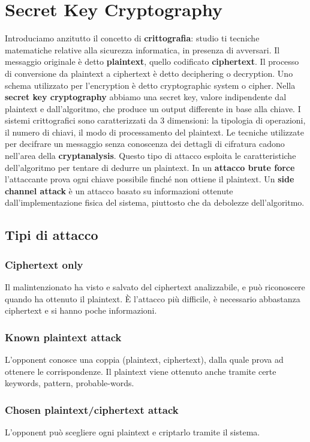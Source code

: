 \documentclass[11pt]{article}
\begin{document}
\section{Secret Key Cryptography}
Introduciamo anzitutto il concetto di \textbf{crittografia}: studio ti tecniche matematiche relative alla sicurezza informatica, in presenza di avversari. Il messaggio originale è detto \textbf{plaintext}, quello codificato \textbf{ciphertext}. Il processo di conversione da plaintext a ciphertext è detto deciphering o decryption. Uno schema utilizzato per l'encryption è detto cryptographic system o cipher.
Nella \textbf{secret key cryptography} abbiamo una secret key, valore indipendente dal plaintext e dall'algoritmo, che produce un output differente in base alla chiave.
I sistemi crittografici sono caratterizzati da 3 dimensioni: la tipologia di operazioni, il numero di chiavi, il modo di processamento del plaintext.
Le tecniche utilizzate per decifrare un messaggio senza conoscenza dei dettagli di cifratura cadono nell'area della \textbf{cryptanalysis}. Questo tipo di attacco esploita le caratteristiche dell'algoritmo per tentare di dedurre un plaintext. In un \textbf{attacco brute force} l'attaccante prova ogni chiave possibile finché non ottiene il plaintext. Un \textbf{side channel attack} è un attacco basato su informazioni ottenute dall'implementazione fisica del sistema, piuttosto che da debolezze dell'algoritmo. 
\subsection{Tipi di attacco}
\subsubsection{Ciphertext only}
Il malintenzionato ha visto e salvato del ciphertext analizzabile, e può riconoscere quando ha ottenuto il plaintext. È l'attacco più difficile, è necessario abbastanza ciphertext e si hanno poche informazioni.
\subsubsection{Known plaintext attack}
L'opponent conosce una coppia (plaintext, ciphertext), dalla quale prova ad ottenere le corrispondenze. Il plaintext viene ottenuto anche tramite certe keywords, pattern, probable-words. 
\subsubsection{Chosen plaintext/ciphertext attack}
L'opponent può scegliere ogni plaintext e criptarlo tramite il sistema.
\end{document}
